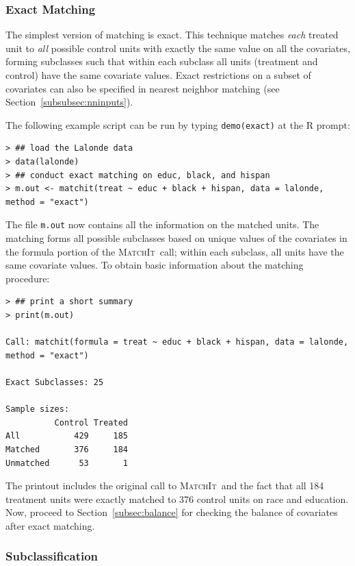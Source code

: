 \documentclass[oneside,letterpaper,titlepage]{article}
\newcommand{\MatchIt}{\textsc{MatchIt}}
\begin{document}
\subsubsection{Exact Matching}
\label{subsubsec:exact}

The simplest version of matching is exact.  This technique matches
\emph{each} treated unit to \emph{all} possible control units with
exactly the same value on all the covariates, forming subclasses such
that within each subclass all units (treatment and control) have the
same covariate values.  Exact restrictions on a subset of covariates
can also be specified in nearest neighbor matching (see
Section~\ref{subsubsec:nninputs}).

The following example script can be run by typing {\tt demo(exact)} at
the R prompt:
\begin{verbatim}
> ## load the Lalonde data
> data(lalonde)
> ## conduct exact matching on educ, black, and hispan
> m.out <- matchit(treat ~ educ + black + hispan, data = lalonde, method = "exact")
\end{verbatim}
The file \texttt{m.out} now contains all the information on the
matched units.  The matching forms all possible subclasses based on
unique values of the covariates in the formula portion of the
\MatchIt\ call; within each subclass, all units have the same
covariate values.  To obtain basic information about the matching
procedure:
\begin{verbatim}
> ## print a short summary
> print(m.out)

Call: matchit(formula = treat ~ educ + black + hispan, data = lalonde,     method = "exact")

Exact Subclasses: 25

Sample sizes:
          Control Treated
All           429     185
Matched       376     184
Unmatched      53       1
\end{verbatim}
The printout includes the original call to \MatchIt\ and the fact that
all 184 treatment units were exactly matched to 376 control units on
race and education. Now, proceed to Section~\ref{subsec:balance} for
checking the balance of covariates after exact matching.

\subsubsection{Subclassification}
\label{subsubsec:subclass}
\end{document}
